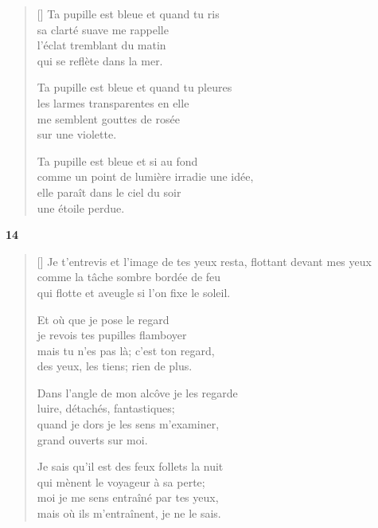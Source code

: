 \documentclass[a4paper,12pt]{book}
\begin{document}
\begin{verse}[\versewidth]
  Ta pupille est bleue et quand tu ris \\
  sa clarté suave me rappelle \\
  l'éclat tremblant du matin \\
  qui se reflète dans la mer.

  Ta pupille est bleue et quand tu pleures \\
  les larmes transparentes en elle \\
  me semblent gouttes de rosée \\
  sur une violette.

  Ta pupille est bleue et si au fond \\
  comme un point de lumière irradie une idée, \\
  elle paraît dans le ciel du soir \\
  une étoile perdue.
\end{verse}

\bigskip

\begin{center}
  \textbf{14}
\end{center}

\settowidth{\versewidth}{Je sais qu'il est des feux follets la nuit}

\begin{verse}[\versewidth]
  Je t'entrevis et l'image de tes yeux resta,
  flottant devant mes yeux \\
  comme la tâche sombre bordée de feu \\
  qui flotte et aveugle si l'on fixe le soleil.

  Et où que je pose le regard \\
  je revois tes pupilles flamboyer \\
  mais tu n'es pas là; c'est ton regard, \\
  des yeux, les tiens; rien de plus.

  Dans l'angle de mon alcôve je les regarde \\
  luire, détachés, fantastiques; \\
  quand je dors je les sens m'examiner, \\
  grand ouverts sur moi.

  Je sais qu'il est des feux follets la nuit \\
  qui mènent le voyageur à sa perte; \\
  moi je me sens entraîné par tes yeux, \\
  mais où ils m'entraînent, je ne le sais.
\end{verse}
\end{document}

